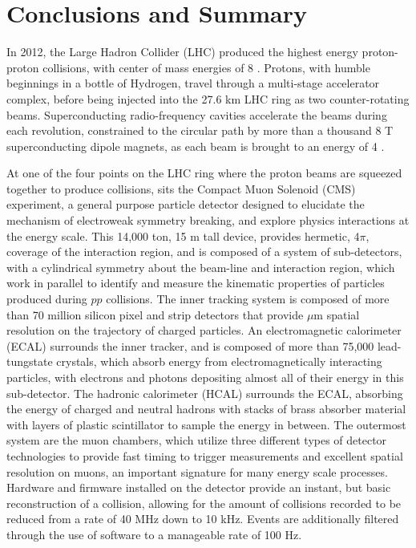 \chapter{Conclusions and Summary}
\label{summary_overview}

\par In 2012, the Large Hadron Collider (LHC) produced the highest
energy proton-proton collisions, with center of mass energies of 8
\TeV.  Protons, with humble beginnings in a bottle of Hydrogen, travel
through a multi-stage accelerator complex, before being injected into
the 27.6 km LHC ring as two counter-rotating beams.  Superconducting
radio-frequency cavities accelerate the beams during each revolution,
constrained to the circular path by more than a thousand 8 T
superconducting dipole magnets, as each beam is brought to an energy
of 4 \TeV.  

\par At one of the four points on the LHC ring where the proton beams
are squeezed together to produce collisions, sits the Compact Muon
Solenoid (CMS) experiment, a general purpose particle detector
designed to elucidate the mechanism of electroweak symmetry breaking,
and explore physics interactions at the \TeV energy scale.  This
14,000 ton, 15 m tall device, provides hermetic, 4$\pi$, coverage of
the interaction region, and is composed of a system of sub-detectors,
with a cylindrical symmetry about the beam-line and interaction
region, which work in parallel to identify and measure the kinematic
properties of particles produced during $pp$ collisions.  The inner
tracking system is composed of more than 70 million silicon pixel and
strip detectors that provide $\mu$m spatial resolution on the
trajectory of charged particles.  An electromagnetic calorimeter
(ECAL) surrounds the inner tracker, and is composed of more than
75,000 lead-tungstate crystals, which absorb energy from
electromagnetically interacting particles, with electrons and photons
depositing almost all of their energy in this sub-detector.  The
hadronic calorimeter (HCAL) surrounds the ECAL, absorbing the energy
of charged and neutral hadrons with stacks of brass absorber material
with layers of plastic scintillator to sample the energy in between.
The outermost system are the muon chambers, which utilize three
different types of detector technologies to provide fast timing to
trigger measurements and excellent spatial resolution on muons, an
important signature for many \TeV energy scale processes.  Hardware
and firmware installed on the detector provide an instant, but basic
reconstruction of a collision, allowing for the amount of collisions
recorded to be reduced from a rate of 40 MHz down to 10 kHz.  Events
are additionally filtered through the use of software to a manageable
rate of 100 Hz.  

